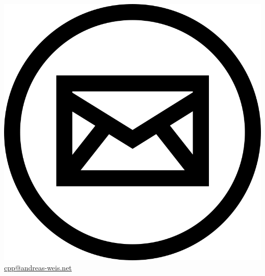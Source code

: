 \documentclass[aspectratio=169]{beamer}
\begin{document}
\begin{frame}
  \href{mailto:cpp@andreas-weis.net}{\includegraphics[height=.06\textheight]{resources/email-icon.png} cpp@andreas-weis.net}

  \vspace{20em}

\end{frame}
\end{document}
